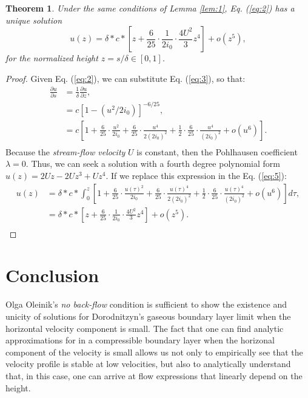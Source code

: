 \documentclass{article}
\newtheorem{theorem}{Theorem}
\begin{document}
\begin{theorem}\label{theo:1}
Under the same conditions of Lemma \ref{lem:1}, Eq. (\ref{eq:2})
has a unique solution
\[u(z) =  \delta * c *
\left[z+\frac{6}{25}\cdot \frac{1}{2i_0} \cdot \frac{4U^2}{3}z^4\right]+o(z^5),\]
for the normalized height $z=s/\delta \in [0,1]$.
\end{theorem}

\begin{proof}
Given Eq. (\ref{eq:2}), we can substitute Eq. (\ref{eq:3}), so that:
\begin{equation}\label{eq:5}
\begin{split}
    \frac{\partial u}{\partial s}
&= \frac{1}{\delta} \frac{\partial u}{\partial z},\\
&= c
\left[1-\left(u^2/2i_0\right)\right]^{-6/25},\\
&= c \left[1+\frac{6}{25}\cdot \frac{u^2}{2i_0}
    +\frac{6}{25}\cdot \frac{u^4}{2(2i_0)^2}
    +\frac{1}{2}\cdot\frac{6}{25}\cdot \frac{u^4}{(2i_0)^2}+o(u^6)\right].\\
\end{split}
\end{equation}
Because the \emph{stream-flow velocity} $U$ is constant, then the Pohlhausen coefficient $\lambda=0$.
Thus, we can seek a solution with a fourth degree polynomial form $u(z)=2Uz-2Uz^3+Uz^4$.
If we replace this expression in the Eq. (\ref{eq:5}):
\begin{equation*}
\begin{split}
    u(z)
&= \delta * c * \int_0^z 
\left[1+\frac{6}{25}\cdot \frac{u(\tau)^2}{2i_0}
    +\frac{6}{25}\cdot \frac{u(\tau)^4}{2(2i_0)^2}
    +\frac{1}{2}\cdot\frac{6}{25}\cdot \frac{u(\tau)^4}{(2i_0)^2}+o(u^6)\right] d\tau,\\
&  = \delta * c *
\left[z+\frac{6}{25}\cdot \frac{1}{2i_0} \cdot \frac{4U^2}{3}z^4\right]+o(z^5).\\
\end{split}
\end{equation*}
\end{proof}


\section{Conclusion}\label{s6}

Olga Oleinik's \emph{no back-flow} condition is sufficient to show the existence
and unicity of solutions for Dorodnitzyn's gaseous boundary layer limit
when the horizontal velocity component is small.
The fact that one can find analytic approximations for in a compressible 
boundary layer when the horizonal component of the velocity is small allows us 
not only to empirically see that the velocity profile is stable at low velocities,
but also to analytically understand that, in this case, 
one can arrive at flow expressions that linearly depend on the height.
\end{document}
